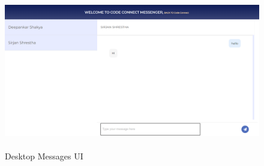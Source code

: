 \begin{figure}[H]
  \centering
  \includegraphics[height = 6.8cm]{Outcome-ss/messenger-full-block.png}
  \caption{Desktop Messages UI}
\end{figure}

